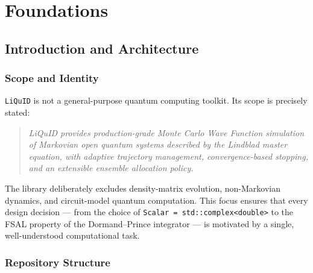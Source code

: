 \documentclass[11pt,a4paper,twoside]{book}
\newcommand{\liquid}{\texttt{LiQuID}}
\newcommand{\code}[1]{\texttt{\small#1}}
\theoremstyle{definition}
\theoremstyle{remark}
\begin{document}
\tableofcontents
\listoffigures
\listoftables

\mainmatter

\part{Foundations}

\chapter{Introduction and Architecture}
\label{chap:intro}

\section{Scope and Identity}
\label{sec:scope}

\liquid{} is not a general-purpose quantum computing toolkit.
Its scope is precisely stated:

\begin{quotation}\itshape
  LiQuID provides production-grade Monte Carlo Wave Function simulation
  of Markovian open quantum systems described by the Lindblad master
  equation, with adaptive trajectory management, convergence-based
  stopping, and an extensible ensemble allocation policy.
\end{quotation}

The library deliberately excludes density-matrix evolution, non-Markovian
dynamics, and circuit-model quantum computation. This focus ensures that
every design decision — from the choice of \code{Scalar = std::complex<double>}
to the FSAL property of the Dormand--Prince integrator — is motivated by
a single, well-understood computational task.

\section{Repository Structure}
\label{sec:repo-structure}
\end{document}
